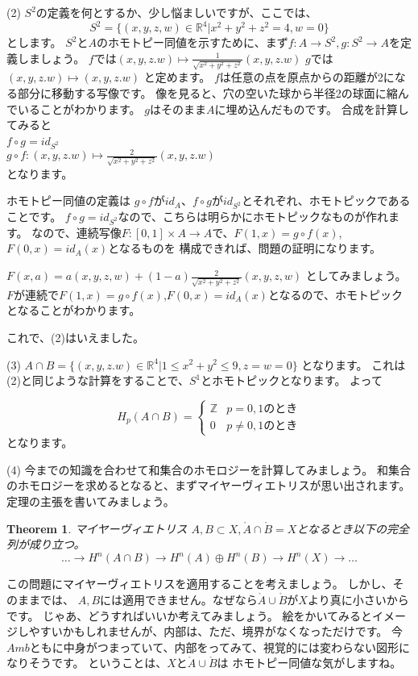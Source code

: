 \documentclass{ujarticle}
\newtheorem{thm}{Theorem}[section]
\begin{document}
(2)
$S^2$の定義を何とするか、少し悩ましいですが、ここでは、
\begin{equation*}
  S^2 = \{ (x,y,z,w) \in \mathbb{R}^4 |  x^2 + y^2 + z^2 = 4 ,w =0 \}
\end{equation*}
とします。
$S^2$と$A$のホモトピー同値を示すために、まず$f:A \to S^2,g:S^2 \to A$を定義しましょう。
$f$では$(x,y,z.w) \mapsto  \frac{1}{\sqrt{x^2 + y^2 + z^2}}(x,y,z.w)$
$g$では$(x,y,z.w) \mapsto  (x,y,z.w)$
と定めます。
$f$は任意の点を原点からの距離が2になる部分に移動する写像です。
像を見ると、穴の空いた球から半径2の球面に縮んでいることがわかります。
$g$はそのまま$A$に埋め込んだものです。
合成を計算してみると　\\
$f \circ g = id_{S^2}$　 \\
$g \circ f :(x,y,z.w) \mapsto \frac{2}{\sqrt{x^2 + y^2 + z^2}}(x,y,z.w) $ \\
となります。

ホモトピー同値の定義は
$g \circ f$が$id_A$、$f \circ  g$が$id_{S^2}$とそれぞれ、ホモトピックであることです。
$f \circ g = id_{S^2}$なので、こちらは明らかにホモトピックなものが作れます。
なので、連続写像$F:[0,1] \times A \to A$で、$F(1,x)=g \circ f (x)$,$F(0,x) = id_A(x)$となるものを
構成できれば、問題の証明になります。

$F(x ,a) =a(x,y,z,w)+(1-a)\frac{2}{\sqrt{x^2 + y^2 + z^2}}(x,y,z,w)$
としてみましょう。
$F$が連続で$F(1,x)=g \circ f (x)$,$F(0,x) = id_A(x)$となるので、ホモトピックとなることがわかります。

これで、(2)はいえました。

(3)
$A \cap B = \{ (x,y,z.w) \in \mathbb{R}^4 |  1 \le x^2 + y^2  \le 9 ,z=w =0 \}$
となります。
これは(2)と同じような計算をすることで、$S^1$とホモトピックとなります。
よって

\begin{equation*}
  H_p(A \cap B ) =
  \begin{cases}
    \mathbb{Z} & \text{$p =0,1$のとき}　\\
    0  & \text{$p  \neq 0,1$のとき}
  \end{cases}
\end{equation*}
となります。

(4)
今までの知識を合わせて和集合のホモロジーを計算してみましょう。
和集合のホモロジーを求めるとなると、まずマイヤーヴィエトリスが思い出されます。
定理の主張を書いてみましょう。

\begin{thm}{マイヤーヴィエトリス}
  $A,B \subset X,\mathring{A}　\cap \mathring{B} =X $となるとき以下の完全列が成り立つ。
  \begin{equation*}
  \dots \to  H^n(A \cap B) \to H^n(A) \oplus H^n(B) \to H^n(X) \to \dots
  \end{equation*}
\end{thm}
この問題にマイヤーヴィエトリスを適用することを考えましょう。
しかし、そのままでは、
$A,B$には適用できません。なぜなら$\mathring{A} \cup \mathring{B}$が$X$より真に小さいからです。
じゃあ、どうすればいいか考えてみましょう。
絵をかいてみるとイメージしやすいかもしれませんが、内部は、ただ、境界がなくなっただけです。
今$Amb$ともに中身がつまっていて、内部をってみて、視覚的には変わらない図形になりそうです。
ということは、$X$と$\mathring{A} \cup \mathring{B}$は
ホモトピー同値な気がしますね。
\end{document}
